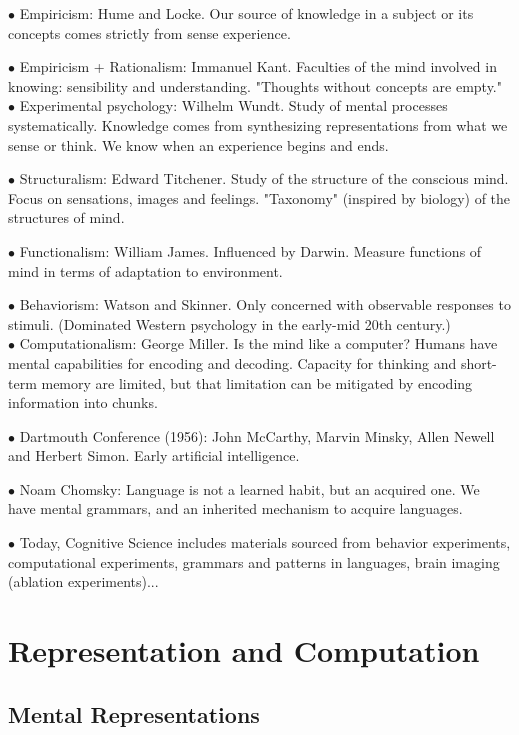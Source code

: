 \documentclass[english,openany]{book}
\begin{document}
$\bullet$ Empiricism: Hume and Locke. Our source of knowledge in a subject or its concepts comes strictly from sense experience.

$\bullet$ Empiricism + Rationalism: Immanuel Kant. Faculties of the mind involved in knowing: sensibility and understanding. "Thoughts without concepts are empty."\\

$\bullet$ Experimental psychology: Wilhelm Wundt. Study of mental processes systematically. Knowledge comes from synthesizing representations from what we sense or think. We know when an experience begins and ends.

$\bullet$ Structuralism: Edward Titchener. Study of the structure of the conscious mind. Focus on sensations, images and feelings. "Taxonomy" (inspired by biology) of the structures of mind.

$\bullet$ Functionalism: William James. Influenced by Darwin. Measure functions of mind in terms of adaptation to environment.

$\bullet$ Behaviorism: Watson and Skinner. Only concerned with observable responses to stimuli. (Dominated Western psychology in the early-mid 20th century.)\\

$\bullet$ Computationalism: George Miller. Is the mind like a computer? Humans have mental capabilities for encoding and decoding. Capacity for thinking and short-term memory are limited, but that limitation can be mitigated by encoding information into chunks.

$\bullet$ Dartmouth Conference (1956): John McCarthy, Marvin Minsky, Allen Newell and Herbert Simon. Early artificial intelligence.

$\bullet$ Noam Chomsky: Language is not a learned habit, but an acquired one. We have mental grammars, and an inherited mechanism to acquire languages.

$\bullet$ Today, Cognitive Science includes materials sourced from behavior experiments, computational experiments, grammars and patterns in languages, brain imaging (ablation experiments)...

\chapter{Representation and Computation}

\section{Mental Representations}
\end{document}
